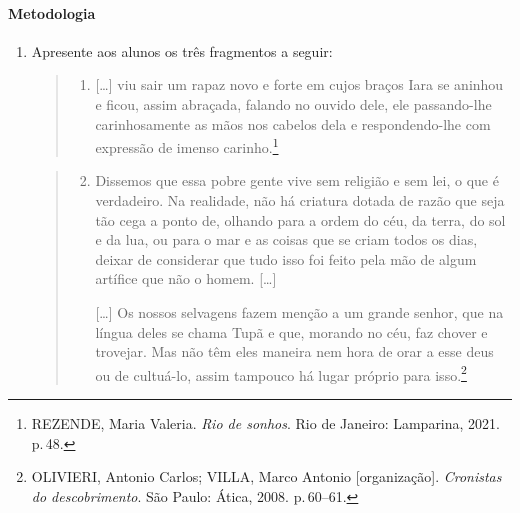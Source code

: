 \documentclass{extarticle}
\begin{document}
\paragraph{Metodologia}
\begin{enumerate}
\item Apresente aos alunos os três fragmentos a seguir:


\begin{quote}
\begin{enumerate}
\item{[}\ldots{}{]} viu sair um rapaz novo e forte em cujos braços Iara
se aninhou e ficou, assim abraçada, falando no ouvido dele, ele
passando-lhe carinhosamente as mãos nos cabelos dela e
respondendo-lhe com expressão de imenso carinho.\footnote{REZENDE, Maria Valeria. \emph{Rio de sonhos}. Rio de Janeiro: Lamparina, 2021. p.\,48.}
\end{enumerate}
\end{quote}

\begin{quote}
\begin{enumerate}
\setcounter{enumii}{1}
\item Dissemos que essa pobre gente vive sem religião e sem lei, o que é
verdadeiro. Na realidade, não há criatura dotada de razão que seja
tão cega a ponto de, olhando para a ordem do céu, da terra, do sol e
da lua, ou para o mar e as coisas que se criam todos os dias, deixar
de considerar que tudo isso foi feito pela mão de algum artífice que
não o homem. {[}\ldots{}{]}


{[}\ldots{}{]} Os nossos selvagens fazem menção a um grande senhor,
que na língua deles se chama Tupã e que, morando no céu, faz chover
e trovejar. Mas não têm eles maneira nem hora de orar a esse deus ou
de cultuá-lo, assim tampouco há lugar próprio para isso.\footnote{OLIVIERI, Antonio Carlos; VILLA, Marco Antonio {[}organização{]}. \emph{Cronistas do descobrimento}. São Paulo: Ática, 2008. p.\,60--61.}
\end{enumerate}
\end{quote}



\end{enumerate}
\end{document}
